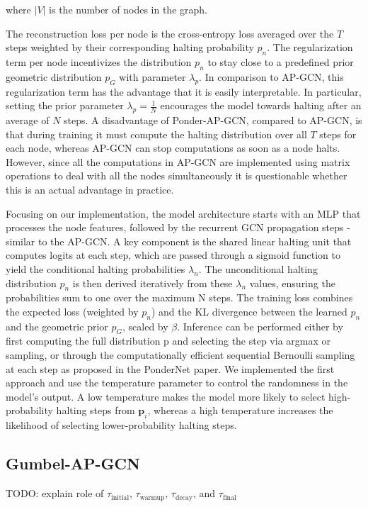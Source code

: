 \documentclass{gdl}
\begin{document}
\noindent where $|V|$ is the number of nodes in the graph.

\noindent The reconstruction loss per node is the cross-entropy loss averaged over the $T$ steps weighted by their corresponding halting probability $p_n$. The regularization term per node incentivizes the distribution $p_n$ to stay close to a predefined prior geometric distribution $p_G$ with parameter $\lambda_p$. In comparison to AP-GCN, this regularization term has the advantage that it is easily interpretable. In particular, setting the prior parameter $\lambda_p = \frac{1}{N}$ encourages the model towards halting after an average of $N$ steps. A disadvantage of Ponder-AP-GCN, compared to AP-GCN, is that during training it must compute the halting distribution over all $T$ steps for each node, whereas AP-GCN can stop computations as soon as a node halts. However, since all the computations in AP-GCN are implemented using matrix operations to deal with all the nodes simultaneously it is questionable whether this is an actual advantage in practice.

Focusing on our implementation, the model architecture starts with an MLP that processes the node features, followed by the recurrent GCN propagation steps - similar to the AP-GCN. A key component is the shared linear halting unit that computes logits at each step, which are passed through a sigmoid function to yield the conditional halting probabilities $\lambda_n$. The unconditional halting distribution $p_n$ is then derived iteratively from these $\lambda_n$  values, ensuring the probabilities sum to one over the maximum N steps. The training loss combines the expected loss (weighted by $p_n$) and the KL divergence between the learned $p_n$ and the geometric prior $p_G$, scaled by $\beta$. Inference can be performed either by first computing the full distribution p and selecting the step via argmax or sampling, or through the computationally efficient sequential Bernoulli sampling at each step as proposed in the PonderNet paper. We implemented the first approach and use the temperature parameter to control the randomness in the model's output. A low temperature makes the model more likely to select high-probability halting steps from $\mathbf{p}_i$, whereas a high temperature increases the likelihood of selecting lower-probability halting steps.

\subsection{Gumbel-AP-GCN}
TODO:  explain role of $\tau_{\text{initial}}$, $\tau_{\text{warmup}}$, $\tau_{\text{decay}}$, and $\tau_{\text{final}}$ 
\end{document}
